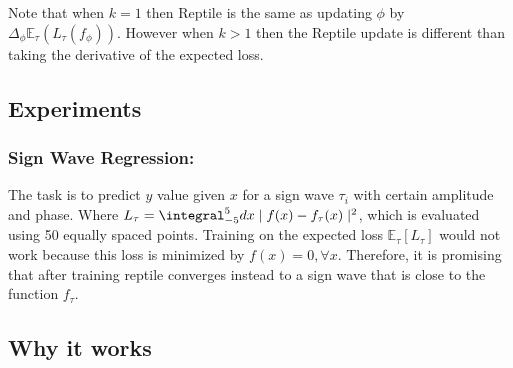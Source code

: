 Note that when $k = 1$ then Reptile is the same as updating $\phi$ by $\Delta_{\phi} \mathbb{E}_{\tau}(L_{\tau}(f_\phi))$.
However when $k > 1$ then the Reptile update is different than taking the derivative of the expected loss.

\subsection{Experiments}

\subsubsection{Sign Wave Regression:}

The task is to predict $y$ value given $x$ for a sign wave $\tau_i$ with certain amplitude and phase.
Where $L_{\tau} = \integral_{-5}^{5} dx \mid f(x) - f_{\tau}(x) \mid^2$, which is evaluated using 50 equally spaced points.
Training on the expected loss $\mathbb{E}_\tau[L_\tau]$ would not work because this loss is minimized by $f(x) = 0, \forall x$.
Therefore, it is promising that after training reptile converges instead to a sign wave that is close to the function $f_{\tau}$.

\subsection{Why it works}
